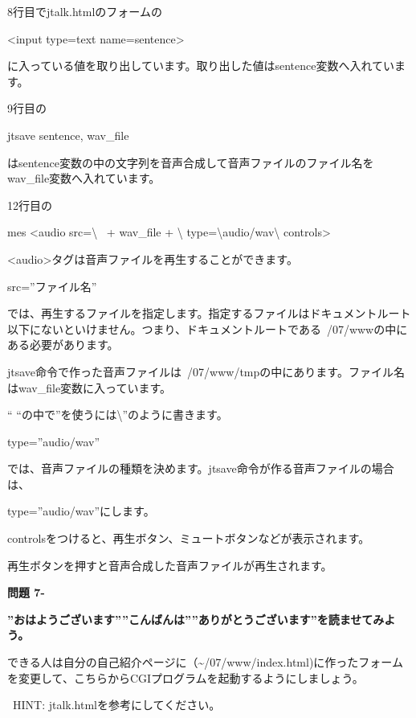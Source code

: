 \documentclass[a4paper,12pt,dvipdfmx]{jarticle}
\newcounter{Question}
\renewcommand\theQuestion{\textbf{問題 7-\arabic{Question}}}
\begin{document}
\bigskip

8行目でjtalk.htmlのフォームの

{\textless}input type={\textquotedbl}text{\textquotedbl} name={\textquotedbl}sentence{\textquotedbl}{\textgreater}

に入っている値を取り出しています。取り出した値はsentence変数へ入れています。

9行目の

jtsave sentence, wav\_file

はsentence変数の中の文字列を音声合成して音声ファイルのファイル名をwav\_file変数へ入れています。

12行目の

mes {\textquotedbl}{\textless}audio src={\textbackslash}{\textquotedbl}{\textquotedbl} \ + wav\_file +
{\textquotedbl}{\textbackslash}{\textquotedbl}
type={\textbackslash}{\textquotedbl}audio/wav{\textbackslash}{\textquotedbl} controls{\textgreater}{\textquotedbl}

	{\textless}audio{\textgreater}タグは音声ファイルを再生することができます。

src=”ファイル名”

では、再生するファイルを指定します。指定するファイルはドキュメントルート以下にないといけません。つまり、ドキュメントルートである~/07/wwwの中にある必要があります。

jtsave命令で作った音声ファイルは~/07/www/tmpの中にあります。ファイル名はwav\_file変数に入っています。

“
“の中で”を使うには{\textbackslash}”のように書きます。

type=”audio/wav”

では、音声ファイルの種類を決めます。jtsave命令が作る音声ファイルの場合は、

type=”audio/wav”にします。

controlsをつけると、再生ボタン、ミュートボタンなどが表示されます。

再生ボタンを押すと音声合成した音声ファイルが再生されます。

\clearpage
{}\theQuestion

{\bfseries
	”おはようございます””こんばんは””ありがとうございます”を読ませてみよう。}


\bigskip

できる人は自分の自己紹介ページに（\~{}/07/www/index.html)に作ったフォームを変更して、こちらからCGIプログラムを起動するようにしましょう。

\ HINT: jtalk.htmlを参考にしてください。
\end{document}
